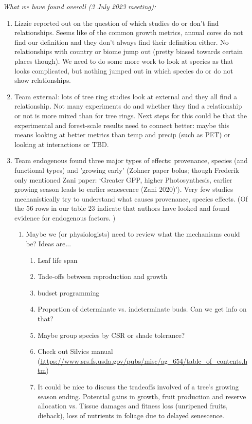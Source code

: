 \documentclass[11pt,letter]{article}
\begin{document}
\emph{What we have found overall (3 July 2023 meeting):}
\begin{enumerate}
\item Lizzie reported out on the question of which studies do or don't find relationships. Seems like of the common growth metrics, annual cores do not find our definition and they don't always find their definition either.  No relationships with country or biome jump out (pretty biased towards certain places though). We need to do some more work to look at species as that looks complicated,  but nothing jumped out in which species do or do not show relationships. 
\item Team external: lots of tree ring studies look at external and they all find a relationship. Not many experiments do and whether they find a relationship or not is more mixed than for tree rings. Next steps for this could be that the experimental and forest-scale results need to connect better: maybe this means looking at better metrics than temp and precip (such as PET) or looking at interactions or TBD.
\item Team endogenous found three major types of effects: provenance, species (and functional types) and 'growing early' (Zohner paper bolus; though Frederik only mentioned Zani paper: `Greater GPP, higher Photosynthesis, earlier growing season leads to earlier senescence (Zani 2020)'). Very few studies mechanistically try to understand what causes provenance, species effects. (Of the 56 rows in our table 23 indicate that authors have looked and found evidence for endogenous factors. )
\begin{enumerate}
\item Maybe we (or physiologists) need to review what the mechanisms could be? Ideas are... 
\begin{enumerate}
\item Leaf life span
\item Tade-offs between reproduction and growth
\item budset programming
\item Proportion of determinate vs. indeterminate buds. Can we get info on that?
\item Maybe group species by CSR or shade tolerance?
\item Check out Silvics manual (\url{https://www.srs.fs.usda.gov/pubs/misc/ag_654/table_of_contents.htm})
\item It could be nice to discuss the tradeoffs involved of a tree’s growing season ending. Potential gains in growth, fruit production and reserve allocation vs. Tissue damages and fitness loss (unripened fruits, dieback), loss of nutrients in foliage due to delayed senescence.

\end{enumerate}
\end{enumerate}
\end{enumerate}
\end{document}
